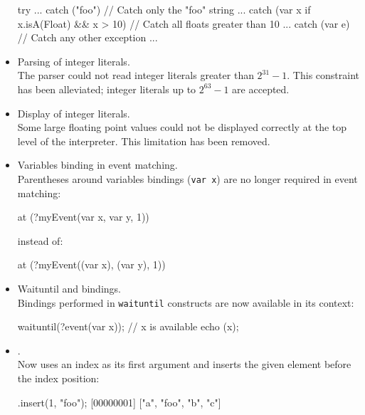 \begin{itemize}
\begin{urbiunchecked}
try
{ ... }
catch ("foo") // Catch only the "foo" string
{ ... }
catch (var x if x.isA(Float) && x > 10) // Catch all floats greater than 10
{ ... }
catch (var e)  // Catch any other exception
{ ... }
\end{urbiunchecked}

\item Parsing of integer literals.\\
  The parser could not read integer literals greater than $2^{31}-1$.  This
  constraint has been alleviated; integer literals up to $2^{63}-1$ are
  accepted.

\item Display of integer literals.\\
  Some large floating point values could not be displayed correctly at the
  top level of the interpreter. This limitation has been removed.

\item Variables binding in event matching.\\
  Parentheses around variables bindings (\lstinline{var x}) are no longer
  required in event matching:

\begin{urbiunchecked}
at (?myEvent(var x, var y, 1))
\end{urbiunchecked}

\noindent
instead of:

\begin{urbiunchecked}
at (?myEvent((var x), (var y), 1))
\end{urbiunchecked}

\item Waituntil and bindings.\\
  Bindings performed in \lstinline{waituntil} constructs are now available
  in its context:

\begin{urbiunchecked}
waituntil(?event(var x));
// x is available
echo (x);
\end{urbiunchecked}

\item {}.\\
  Now uses an index as its first argument and inserts the given element
  before the index position:

\begin{urbiscript}
["a", "b", "c"].insert(1, "foo");
[00000001] ["a", "foo", "b", "c"]
\end{urbiscript}


\end{itemize}
